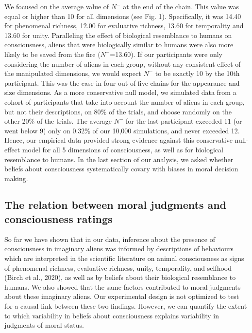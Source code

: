 \documentclass[10pt, letterpaper]{article}
\begin{document}
We focused on the average value of \(N^-\) at the end of the chain. This
value was equal or higher than 10 for all dimensions (see Fig. 1).
Specifically, it was 14.40 for phenomenal richness, 12.00 for evaluative
richness, 13.60 for temporality and 13.60 for unity. Paralleling the
effect of biological resemblance to humans on consciousness, aliens that
were biologically similar to humans were also more likely to be saved
from the fire (\(N^-\)=13.60). If our participants were only considering
the number of aliens in each group, without any consistent effect of the
manipulated dimensions, we would expect \(N^-\) to be exactly 10 by the
10th participant. This was the case in four out of five chains for the
appearance and size dimensions. As a more conservative null model, we
simulated data from a cohort of participants that take into account the
number of aliens in each group, but not their descriptions, on 80\% of
the trials, and choose randomly on the other 20\% of the trials. The
average \(N^-\) for the last participant exceeded 11 (or went below 9)
only on 0.32\% of our 10,000 simulations, and never exceeded 12. Hence,
our empirical data provided strong evidence against this conservative
null-effect model for all 5 dimensions of consciousness, as well as for
biological resemblance to humans. In the last section of our analysis,
we asked whether beliefs about consciousness systematically covary with
biases in moral decision making.

\hypertarget{the-relation-between-moral-judgments-and-consciousness-ratings}{%
\subsection{The relation between moral judgments and consciousness
ratings}\label{the-relation-between-moral-judgments-and-consciousness-ratings}}

So far we have shown that in our data, inference about the presence of
consciousness in imaginary aliens was informed by descriptions of
behaviours which are interpreted in the scientific literature on animal
consciousness as signs of phenomenal richness, evaluative richness,
unity, temporality, and selfhood (Birch et al., 2020), as well as by
beliefs about their biological resemblance to humans. We also showed
that the same factors contributed to moral judgments about these
imaginary aliens. Our experimental design is not optimized to test for a
causal link between these two findings. However, we can quantify the
extent to which variability in beliefs about consciousness explains
variability in judgments of moral status.
\end{document}
